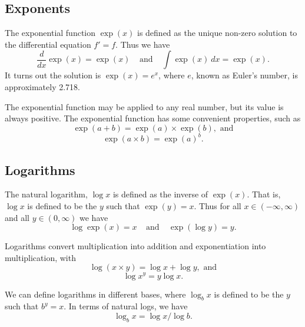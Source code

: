 \subsection{Exponents}

The exponential function $\exp(x)$ is defined as the unique non-zero
solution to the differential equation $f' = f$.  Thus we have
%
\begin{equation}
\frac{d}{dx}\exp(x) = \exp(x)
\ \ \ \ \ \mbox{and} \ \ \ \ \ 
\int \exp(x) \ dx = \exp(x).
\end{equation}
%
It turns out the solution is $\exp(x) = e^x$, where $e$, known as
Euler's number, is approximately 2.718.

The exponential function may be applied to any real number, but its
value is always positive.  The exponential function has some
convenient properties, such as
%
\begin{equation}
\exp(a + b) = \exp(a) \times \exp(b), \mbox{ and}
\end{equation}
%
\begin{equation}
\exp(a \times b) = \exp(a)^b.
\end{equation}


\subsection{Logarithms}

The natural logarithm, $\log x$ is defined as the inverse of
$\exp(x)$.  That is, $\log x$ is defined to be the $y$ such that
$\exp(y) = x$.  Thus for all $x \in (-\infty,\infty)$ and all $y \in
(0,\infty)$ we have
%
\begin{equation}
\log \exp(x) = x
\ \ \ \ \ \mbox{and} \ \ \ \ \ 
\exp(\log y) = y.
\end{equation}
%

Logarithms convert multiplication into addition and exponentiation
into multiplication, with
%
\begin{equation}
\log (x \times y) = \log x + \log y, \mbox{ and}
\end{equation}
%
\begin{equation}
\log x^y = y \log x.
\end{equation}

We can define logarithms in different bases, where $\log_b x$ is defined
to be the $y$ such that $b^y = x$.  In terms of natural logs, we have
%
\begin{equation}
\log_b x = \log x / \log b.
\end{equation}

